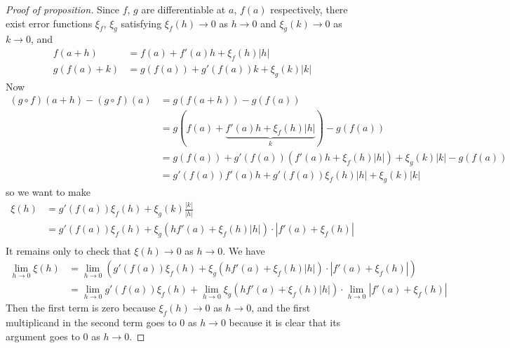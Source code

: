 \documentclass{../../template/note}
\begin{document}
    \begin{proof}[Proof of proposition]
        Since \(f\), \(g\) are differentiable at \(a\), \(f(a)\) respectively, there exist error functions \(\xi_f\), \(\xi_g\) satisfying \(\xi_f(h) \to 0\) as \(h \to 0\) and \(\xi_g(k) \to 0\) as \(k \to 0\), and
        \begin{align*}
            f(a+h) &= f(a) + f'(a)h + \xi_f(h)|h| \\
            g(f(a)+k) &= g(f(a)) + g'(f(a))k + \xi_g(k)|k|
        \end{align*}
        Now
        \begin{align*}
            (g \circ f)(a+h) - (g \circ f)(a) &= g(f(a+h)) - g(f(a)) \\
            &= g(f(a) + \underbrace{f'(a)h + \xi_f(h)|h|}_k) - g(f(a)) \\
            &= g(f(a)) + g'(f(a))\left(f'(a)h + \xi_f(h)|h|\right) + \xi_g(k)|k| - g(f(a)) \\
            &= g'(f(a))f'(a)h + g'(f(a))\xi_f(h)|h| + \xi_g(k)|k|
        \end{align*}
        so we want to make
        \begin{align*}
            \xi(h) &= g'(f(a))\xi_f(h) + \xi_g(k)\frac{|k|}{|h|} \\
            &= g'(f(a))\xi_f(h) + \xi_g(hf'(a)+\xi_f(h)|h|)\cdot|f'(a)+\xi_f(h)| \\
        \end{align*}
        It remains only to check that \(\xi(h) \to 0\) as \(h \to 0\). We have
        \begin{align*}
            \lim_{h \to 0} \xi(h) &= \lim_{h \to 0} \left(g'(f(a))\xi_f(h) + \xi_g(hf'(a)+\xi_f(h)|h|)\cdot|f'(a)+\xi_f(h)|\right) \\
            &= \lim_{h \to 0} g'(f(a))\xi_f(h) + \lim_{h \to 0} \xi_g(hf'(a)+\xi_f(h)|h|) \cdot \lim_{h \to 0} |f'(a)+\xi_f(h)|
        \end{align*}
        Then the first term is zero because \(\xi_f(h) \to 0\) as \(h \to 0\), and the first multiplicand in the second term goes to 0 as \(h \to 0\) because it is clear that its argument goes to 0 as \(h \to 0\).
    \end{proof}
    
\end{document}
